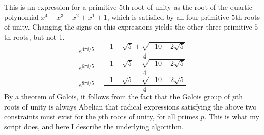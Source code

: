 \documentclass{article}
\begin{document}
	This is an expression for a primitive $ 5 $th root of unity as the root of the quartic polynomial $ x^4 + x^3 + x^2 + x^1 + 1 $, which is satisfied by all four primitive $ 5 $th roots of unity. Changing the signs on this expressions yields the other three primitive $ 5 $th roots, but not 1.\\
$$ e^{4 \pi i/5} = \frac{-1 - \sqrt{5} + \sqrt{-10 + 2 \sqrt{5}}}{4} $$
$$ e^{6 \pi i/5} = \frac{-1 - \sqrt{5} - \sqrt{-10 + 2 \sqrt{5}}}{4} $$
$$ e^{8 \pi i/5} = \frac{-1 + \sqrt{5} - \sqrt{-10 - 2 \sqrt{5}}}{4} $$
	By a theorem of Galois, it follows from the fact that the Galois group of $ p $th roots of unity is always Abelian that radical expressions satisfying the above two constraints must exist for the $ p $th roots of unity, for all primes $ p $. This is what my script does, and here I describe the underlying algorithm.\\
\end{document}

